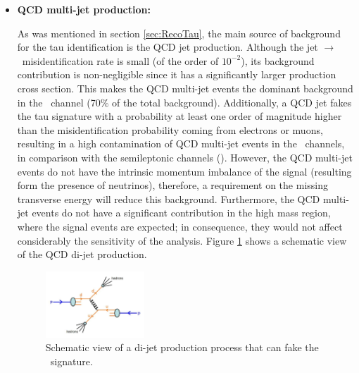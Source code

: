 \begin{itemize}
 \item \textbf{QCD multi-jet production:}
 
As was mentioned in section \ref{sec:RecoTau}, the main 
source of background for the tau identification is the QCD jet 
production. Although the jet $\rightarrow$ \tauh~misidentification 
rate is small (of the order of $10^{-2}$), its background contribution 
is non-negligible since it has a significantly larger production cross section. This makes
the QCD multi-jet events the dominant background 
in the \Zprimetotauh~channel (70$\%$ of the 
total background). Additionally, a QCD jet fakes 
the tau signature with a probability at least one 
order of magnitude higher than the misidentification
probability coming from electrons or muons, resulting 
in a high contamination of QCD multi-jet events in 
the \tauh\tauh~channels, in comparison with the 
semileptonic channels (\tauell\tauh). However, the QCD multi-jet events 
do not have the intrinsic momentum imbalance of the signal (resulting
form the presence of neutrinos), therefore, a requirement on the 
missing transverse energy will reduce this background. Furthermore, the 
QCD multi-jet events do not have a significant contribution in the 
high mass region, where the signal events are expected; in 
consequence, they would not affect considerably the sensitivity of the 
analysis. Figure \ref{fig:backgroundQCD} shows a schematic view of the
QCD di-jet production.

\begin{figure}[ht]
 \begin{center} 
 \includegraphics[clip,width=0.35\textwidth]{figuras/Chapter4/QCD}
   \caption{
  Schematic view of a di-jet production process that can fake the \Zprimetotauh~signature.
   }
   \label{fig:backgroundQCD}
\end{center}
\end{figure}



\end{itemize}
